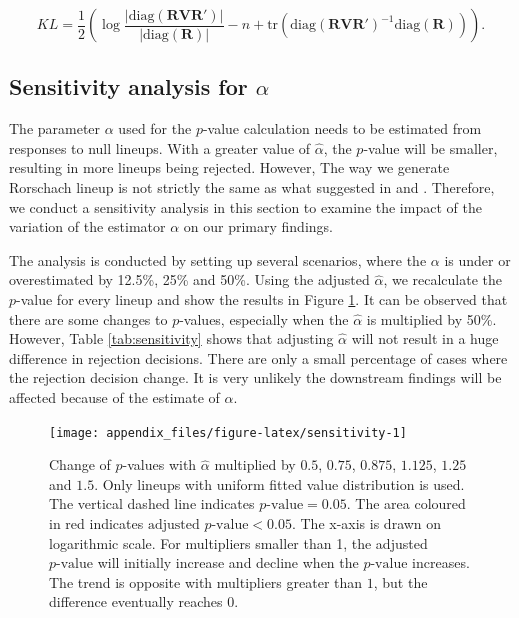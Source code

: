 \documentclass[]{interact}
\theoremstyle{plain}%
\theoremstyle{definition}
\theoremstyle{remark}
\begin{document}
\[KL = \frac{1}{2}\left(\log\frac{|\text{diag}(\boldsymbol{R}\boldsymbol{V}\boldsymbol{R}')|}{|\text{diag}(\boldsymbol{R})|} - n + \text{tr}(\text{diag}(\boldsymbol{R}\boldsymbol{V}\boldsymbol{R}')^{-1}\text{diag}(\boldsymbol{R}))\right).\]

\hypertarget{sensitivity-analysis-for-alpha}{%
\subsection{\texorpdfstring{Sensitivity analysis for
\(\alpha\)}{Sensitivity analysis for \textbackslash alpha}}\label{sensitivity-analysis-for-alpha}}

The parameter \(\alpha\) used for the \(p\)-value calculation needs to
be estimated from responses to null lineups. With a greater value of
\(\hat{\alpha}\), the \(p\)-value will be smaller, resulting in more
lineups being rejected. However, The way we generate Rorschach lineup is
not strictly the same as what suggested in
\citet{vanderplas2021statistical} and \citet{buja2009statistical}.
Therefore, we conduct a sensitivity analysis in this section to examine
the impact of the variation of the estimator \(\alpha\) on our primary
findings.

The analysis is conducted by setting up several scenarios, where the
\(\alpha\) is under or overestimated by 12.5\%, 25\% and 50\%. Using the
adjusted \(\hat{\alpha}\), we recalculate the \(p\)-value for every
lineup and show the results in Figure \ref{fig:sensitivity}. It can be
observed that there are some changes to \(p\)-values, especially when
the \(\hat{\alpha}\) is multiplied by 50\%. However, Table
\ref{tab:sensitivity} shows that adjusting \(\hat{\alpha}\) will not
result in a huge difference in rejection decisions. There are only a
small percentage of cases where the rejection decision change. It is
very unlikely the downstream findings will be affected because of the
estimate of \(\alpha\).

\begin{figure}

{\centering \texttt{[image: appendix\_files/figure-latex/sensitivity-1]} 

}

\caption{Change of $p$-values with $\hat{\alpha}$ multiplied by $0.5$, $0.75$, $0.875$, $1.125$, $1.25$ and $1.5$. Only lineups with uniform fitted value distribution is used. The vertical dashed line indicates $p\text{-value} = 0.05$. The area coloured in red indicates $\text{adjusted }p\text{-value} < 0.05$. The x-axis is drawn on logarithmic scale. For multipliers smaller than 1, the adjusted $p\text{-value}$ will initially increase and decline when the $p\text{-value}$ increases. The trend is opposite with multipliers greater than $1$, but the difference eventually reaches $0$.}\label{fig:sensitivity}
\end{figure}
\end{document}
